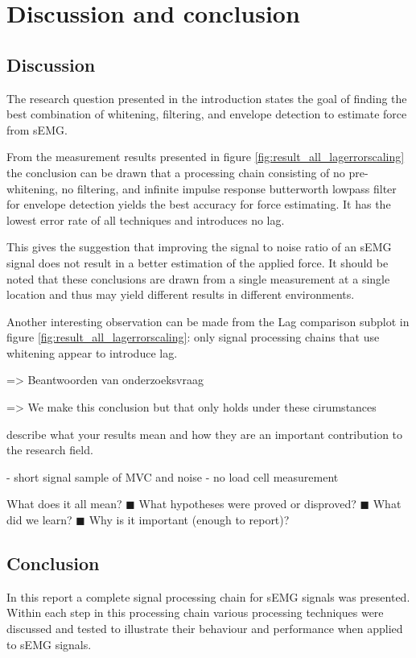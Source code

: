 \chapter{Discussion and conclusion}
\section{Discussion}
The research question presented in the introduction states the goal of finding the best combination of whitening, filtering, and envelope detection to estimate force from sEMG. 

From the measurement results presented in figure \ref{fig:result_all_lagerrorscaling} the conclusion can be drawn that a processing chain consisting of no pre-whitening, no filtering, and infinite impulse response butterworth lowpass filter for envelope detection yields the best accuracy for force estimating. It has the lowest error rate of all techniques and introduces no lag.

This gives the suggestion that improving the signal to noise ratio of an sEMG signal does not result in a better estimation of the applied force. It should be noted that these conclusions are drawn from a single measurement at a single location and thus may yield different results in different environments. 

Another interesting observation can be made from the Lag comparison subplot in figure \ref{fig:result_all_lagerrorscaling}: only signal processing chains that use whitening appear to introduce lag.



=> Beantwoorden van onderzoeksvraag

=> We make this conclusion but that only holds under these cirumstances

describe what your results mean and how they are an important contribution to the research field.

- short signal sample of MVC and noise
- no load cell measurement


What does it all mean?
◼ What hypotheses were proved or disproved?
◼ What did we learn?
◼ Why is it important (enough to report)?
\section{Conclusion}
In this report a complete signal processing chain for sEMG signals was presented. Within each step in this processing chain various processing techniques were discussed and tested to illustrate their behaviour and performance when applied to sEMG signals. 



